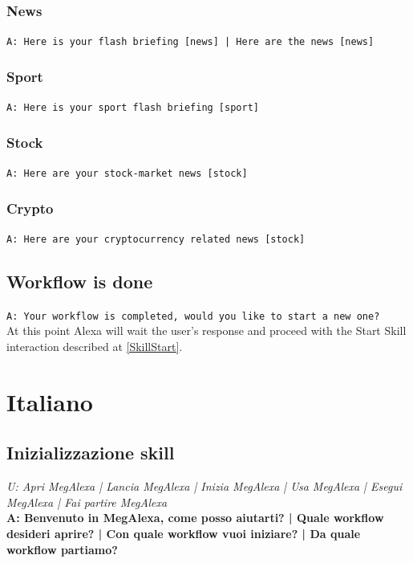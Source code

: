 \subsubsection{News}
\texttt{A: Here is your flash briefing [news] | Here are the news [news]}

\subsubsection{Sport}
\texttt{A: Here is your sport flash briefing [sport]}

\subsubsection{Stock}  
\texttt{A: Here are your stock-market news [stock]}

\subsubsection{Crypto}   
\texttt{A: Here are your cryptocurrency related news [stock]}

\subsection{Workflow is done}
\texttt{A: Your workflow is completed, would you like to start a new one?}\\
At this point Alexa will wait the user's response and proceed with the Start Skill interaction described at \ref{SkillStart}.

\section{Italiano}
\subsection{Inizializzazione skill} \label{InizializzazioneSkill}
\textit{U: Apri MegAlexa | Lancia MegAlexa | Inizia MegAlexa | Usa MegAlexa | Esegui MegAlexa | Fai partire MegAlexa}\\
\textbf{A: Benvenuto in MegAlexa, come posso aiutarti? | Quale workflow desideri aprire? | Con quale workflow vuoi iniziare? | Da quale workflow partiamo?}

